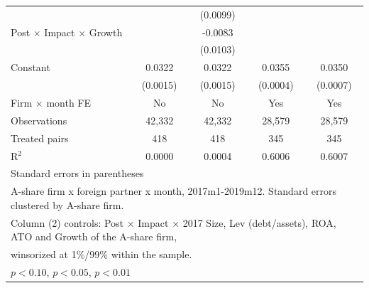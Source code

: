 {\begin{tabular}{l*{4}{c}}
            &                     &    (0.0099)         &                     &                     \\
Post \(\times\) Impact \(\times\) Growth&                     &     -0.0083         &                     &                     \\
            &                     &    (0.0103)         &                     &                     \\
Constant    &      0.0322\sym{***}&      0.0322\sym{***}&      0.0355\sym{***}&      0.0350\sym{***}\\
            &    (0.0015)         &    (0.0015)         &    (0.0004)         &    (0.0007)         \\
\midrule
Firm \(\times\) month FE&          No         &          No         &         Yes         &         Yes         \\
Observations&      42,332         &      42,332         &      28,579         &      28,579         \\
Treated pairs&         418         &         418         &         345         &         345         \\
R\(^2\)     &      0.0000         &      0.0004         &      0.6006         &      0.6007         \\
\bottomrule
\multicolumn{5}{l}{\footnotesize Standard errors in parentheses}\\
\multicolumn{5}{l}{\footnotesize A-share firm x foreign partner x month, 2017m1-2019m12. Standard errors clustered by A-share firm.}\\
\multicolumn{5}{l}{\footnotesize Column (2) controls: Post \(\times\) Impact \(\times\) 2017 Size, Lev (debt/assets), ROA, ATO and Growth of the A-share firm,}\\
\multicolumn{5}{l}{\footnotesize winsorized at 1\%/99\% within the sample.}\\
\multicolumn{5}{l}{\footnotesize \sym{*} \(p<0.10\), \sym{**} \(p<0.05\), \sym{***} \(p<0.01\)}\\
\end{tabular}
}
